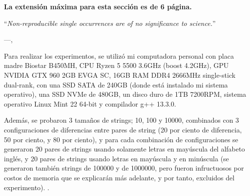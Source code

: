 \begin{mdframed}
    \textbf{La extensión máxima para esta sección es de 6 página.}
\end{mdframed}


\epigraph{``\textit{Non-reproducible single occurrences are of no significance to
science.}''}{---\citeauthor{popper2005logic},\citeyear{popper2005logic} \cite{popper2005logic}}
Para realizar los experimentos, se utilizó mi computadora personal con placa madre Biostar B450MH, CPU Ryzen 5 5500 3.6GHz (boost 4.2GHz), GPU NVIDIA GTX 960 2GB EVGA SC, 16GB RAM DDR4 2666MHz single-stick dual-rank, con una SSD SATA de 240GB (donde está instalado mi sistema operativo), una SSD NVMe de 480GB, un disco duro de 1TB 7200RPM, sistema operativo Linux Mint 22 64-bit y compilador g++ 13.3.0.

Además, se probaron 3 tamaños de strings; 10, 100 y 10000, combinados con 3 configuraciones de diferencias entre pares de string (20 por ciento de diferencia, 50 por ciento, y 80 por ciento), y para cada combinación de configuraciones se generaron 20 pares de strings usando solamente letras en mayúscula del alfabeto inglés, y 20 pares de strings usando letras en mayúscula y en minúscula (se generaron también strings de 100000 y de 1000000, pero fueron infructuosos por costos de memoria que se explicarán más adelante, y por tanto, excluidos del experimento).
\cite{inbookFonseca}.
